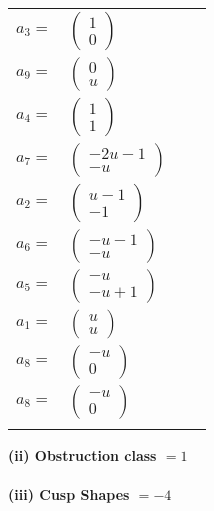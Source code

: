 \documentclass[1p]{elsarticle_modified}
\theoremstyle{definition}
\begin{document}
\begin{tabular}{m{7pt} m{180pt} m{7pt} m{180pt} }
\flushright $a_{3}=$&$\begin{pmatrix}1\\0\end{pmatrix}$ \\
\flushright $a_{9}=$&$\begin{pmatrix}0\\u\end{pmatrix}$ \\
\flushright $a_{4}=$&$\begin{pmatrix}1\\1\end{pmatrix}$ \\
\flushright $a_{7}=$&$\begin{pmatrix}-2 u-1\\- u\end{pmatrix}$ \\
\flushright $a_{2}=$&$\begin{pmatrix}u-1\\-1\end{pmatrix}$ \\
\flushright $a_{6}=$&$\begin{pmatrix}- u-1\\- u\end{pmatrix}$ \\
\flushright $a_{5}=$&$\begin{pmatrix}- u\\- u+1\end{pmatrix}$ \\
\flushright $a_{1}=$&$\begin{pmatrix}u\\u\end{pmatrix}$ \\
\flushright $a_{8}=$&$\begin{pmatrix}- u\\0\end{pmatrix}$\\ \flushright $a_{8}=$&$\begin{pmatrix}- u\\0\end{pmatrix}$\\&\end{tabular}
\flushleft \textbf{(ii) Obstruction class $= 1$}\\~\\
\flushleft \textbf{(iii) Cusp Shapes $= -4$}\\~\\
\end{document}
